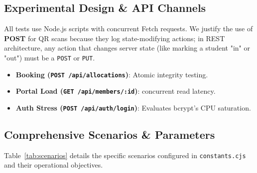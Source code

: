 \documentclass[sigconf]{acmart}
\begin{document}


\subsection{Experimental Design \& API Channels}
All tests use Node.js scripts with concurrent Fetch requests. We justify the use of \textbf{POST} for QR scans because they log state-modifying actions; in REST architecture, any action that changes server state (like marking a student "in" or "out") must be a \texttt{POST} or \texttt{PUT}.

\begin{itemize}[leftmargin=*]
    \item \textbf{Booking (\texttt{POST /api/allocations})}: Atomic integrity testing.
    \item \textbf{Portal Load (\texttt{GET /api/members/:id})}: concurrent read latency.
    \item \textbf{Auth Stress (\texttt{POST /api/auth/login})}: Evaluates bcrypt's CPU saturation.
\end{itemize}


\subsection{Comprehensive Scenarios \& Parameters}
Table~\ref{tab:scenarios} details the specific scenarios configured in \texttt{constants.cjs} and their operational objectives.
\end{document}
